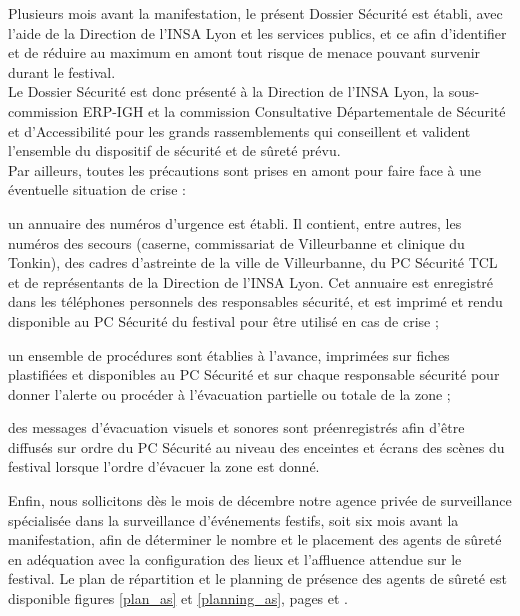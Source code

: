 \documentclass[hidelinks, paper=a4, fontsize=13pt]{report}
\begin{document}
Plusieurs mois avant la manifestation, le présent Dossier Sécurité est établi, avec l'aide de la Direction de l'INSA Lyon et les services publics, et ce afin d'identifier et de réduire au maximum en amont tout risque de menace pouvant survenir durant le festival.\\

Le Dossier Sécurité est donc présenté à la Direction de l'INSA Lyon, la sous-commission ERP-IGH et la commission Consultative Départementale de Sécurité et d'Accessibilité pour les grands rassemblements qui conseillent et valident l'ensemble du dispositif de sécurité et de sûreté prévu.\\

Par ailleurs, toutes les précautions sont prises en amont pour faire face à une éventuelle situation de crise :
\begin{list}{•}{}
	\item un annuaire des numéros d'urgence est établi. Il contient, entre autres, les numéros des secours (caserne, commissariat de Villeurbanne et clinique du Tonkin), des cadres d'astreinte de la ville de Villeurbanne, du PC Sécurité TCL et de représentants de la Direction de l'INSA Lyon. Cet annuaire est enregistré dans les téléphones personnels des responsables sécurité, et est imprimé et rendu disponible au PC Sécurité du festival pour être utilisé en cas de crise ;
	\item un ensemble de procédures sont établies à l'avance, imprimées sur fiches plastifiées et disponibles au PC Sécurité et sur chaque responsable sécurité pour donner l'alerte ou procéder à l'évacuation partielle ou totale de la zone ;
	\item des messages d'évacuation visuels et sonores sont préenregistrés afin d'être diffusés sur ordre du PC Sécurité au niveau des enceintes et écrans des scènes du festival lorsque l'ordre d'évacuer la zone est donné.\\
\end{list}

Enfin, nous sollicitons dès le mois de décembre notre agence privée de surveillance spécialisée dans la surveillance d'événements festifs, soit six mois avant la manifestation, afin de déterminer le nombre et le placement des agents de sûreté en adéquation avec la configuration des lieux et l'affluence attendue sur le festival. Le plan de répartition et le planning de présence des agents de sûreté est disponible figures \ref{plan_as} et \ref{planning_as}, pages \pageref{plan_as} et \pageref{planning_as}.
 
\end{document}
